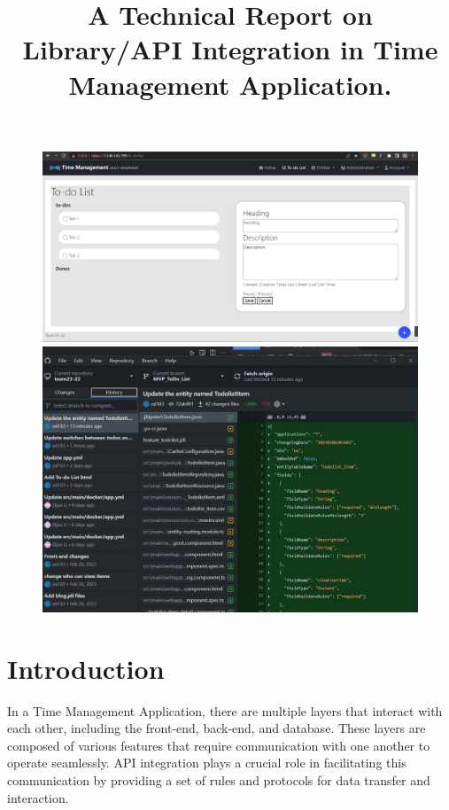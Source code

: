 \documentclass[peerreview]{IEEEtran}
\begin{document}
\newpage

\begin{figure}[!h]
  \centering
  \includegraphics[width=1\columnwidth]{./images/MVP_3.png} 
  \includegraphics[width=1\columnwidth]{./images/MVP_4.png} 
  \label{fig_MVP_2}
\end{figure}



\newpage

\title{A Technical Report on Library/API Integration in Time Management Application.}
\IEEEpeerreviewmaketitle

\section{Introduction}
  In a Time Management Application, there are multiple layers that interact with each other, including the front-end, back-end, and database. These layers are composed of various features that require communication with one another to operate seamlessly. API integration plays a crucial role in facilitating this communication by providing a set of rules and protocols for data transfer and interaction. 
\end{document}
